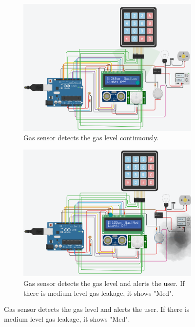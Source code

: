 \documentclass[a4paper,12pt]{article}
\begin{document}
\begin{figure}[H]
  \centering
  \begin{subfigure}{0.45\textwidth}
      \centering
      \includegraphics[width=\linewidth]{gassensor1.png}
      \caption{Gas sensor detects the gas level continuously.}
  \end{subfigure}
  \hfill
  \begin{subfigure}{0.45\textwidth}
      \centering
      \includegraphics[width=\linewidth]{gassensor3.png}
      \caption{Gas sensor detects the gas level and alerts the user. If there is medium level gas leakage, it shows "Med".}
  \end{subfigure}

  \vspace{1em}


\end{figure}
\end{document}

